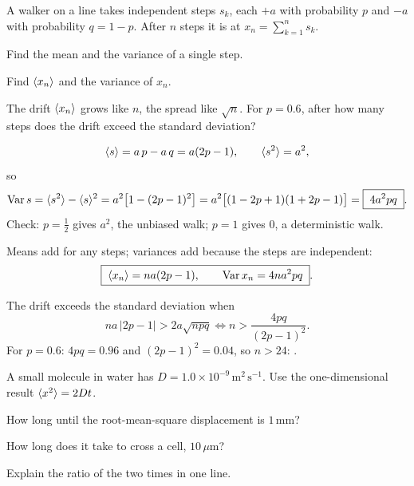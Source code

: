

A walker on a line takes independent steps $s_k$, each $+a$ with probability
$p$ and $-a$ with probability $q=1-p$. After $n$ steps it is at
$x_n=\sum_{k=1}^n s_k$.
\begin{parts}
  \item Find the mean and the variance of a single step.
  \item Find $\langle x_n \rangle$ and the variance of $x_n$.
  \item The drift $\langle x_n \rangle$ grows like $n$, the spread like $\sqrt n$.
        For $p=0.6$, after how many steps does the drift exceed the
        standard deviation?
\end{parts}

\solution

\begin{equation}
  \langle s \rangle=a\,p-a\,q=a(2p-1),\qquad \langle s^2 \rangle=a^2 ,
\end{equation}
so
\begin{equation}
  \operatorname{Var}s=\langle s^2 \rangle-\langle s \rangle^2=a^2\bigl[1-(2p-1)^2\bigr]
  =a^2\bigl[(1-2p+1)(1+2p-1)\bigr]=\boxed{\;4a^2pq\;}.
\end{equation}
Check: $p=\tfrac12$ gives $a^2$, the unbiased walk; $p=1$ gives $0$, a
deterministic walk.

Means add for any steps; variances add because the steps are independent:
\begin{equation}
  \boxed{\;\langle x_n \rangle=na(2p-1),\qquad \operatorname{Var}x_n=4na^2pq\;}.
\end{equation}

The drift exceeds the standard deviation when
\begin{equation}
  na\,\lvert 2p-1\rvert>2a\sqrt{npq}
  \iff n>\frac{4pq}{(2p-1)^2}.
\end{equation}
For $p=0.6$: $4pq=0.96$ and $(2p-1)^2=0.04$, so $n>24$:
.


A small molecule in water has $D=1.0\times10^{-9}\,\mathrm{m^2\,s^{-1}}$.
Use the one-dimensional result $\langle x^2 \rangle=2Dt$.
\begin{parts}
  \item How long until the root-mean-square displacement is $1\,\mathrm{mm}$?
  \item How long does it take to cross a cell, $10\,\mu\mathrm{m}$?
  \item Explain the ratio of the two times in one line.
\end{parts}

